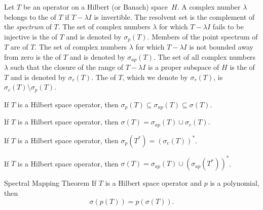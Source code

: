 \begin{defn} Let $T$ be an operator on a Hilbert (or Banach) space~$H$. A complex number $\lambda$ belongs to the
 of $T$ if $T - \lambda I$ is invertible. The resolvent set is the complement of the \emph{spectrum}
of $T$. The set of complex numbers $\lambda$ for which $T - \lambda I$ fails to be injective is the
 of $T$ and is denoted
by $\sigma_p(T)$. Members of the point spectrum of $T$ are
 of $T$. The set of complex numbers $\lambda$ for which $T - \lambda I$ is not bounded away from zero is the
 of $T$ and is denoted
by $\sigma_{ap}(T)$. The set of all complex numbers $\lambda$ such that the closure of the range of $T - \lambda I$ is a proper
subspace of $H$ is the
 of $T$ and is denoted
by $\sigma_c(T)$.  The
 of $T$, which we denote
by $\sigma_r(T)$, is $\sigma_c(T) \setminus \sigma_p(T)$.
\end{defn}

\begin{prop} If $T$ is a Hilbert space operator, then $\sigma_p(T) \subseteq \sigma_{ap}(T) \subseteq \sigma(T)$.
\end{prop}

\begin{prop} If $T$ is a Hilbert space operator, then $\sigma(T) = \sigma_{ap}(T) \cup \sigma_c(T)$.
\end{prop}

\begin{prop} If $T$ is a Hilbert space operator, then $\sigma_p(T^*) = (\sigma_c(T))^*$.
\end{prop}

\begin{cor} If $T$ is a Hilbert space operator, then $\sigma(T) = \sigma_{ap}(T) \cup (\sigma_{ap}(T^*))^*$.
\end{cor}

\begin{thm}{Spectral Mapping Theorem}\label{SMThm} If $T$ is a Hilbert space operator and $p$ is a polynomial, then
   \[ \sigma(p(T)) = p(\sigma(T)). \]
\end{thm}

